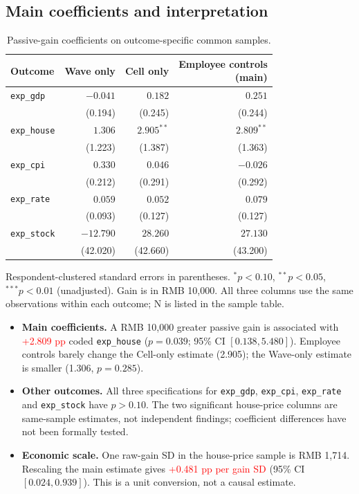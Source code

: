 \documentclass[11pt,letterpaper,english,final]{article}
\begin{document}
\subsection{Main coefficients and interpretation}
\begin{table}[H]
\centering\small
\setlength{\tabcolsep}{5pt}
\caption{Passive-gain coefficients on outcome-specific common samples.}
\begin{tabular}{lrrr}
\toprule
Outcome & Wave only & Cell only & \shortstack{Employee controls\\(main)} \\
\midrule
\texttt{exp\_gdp} & $-0.041$ & $0.182$ & $0.251$ \\
 & (0.194) & (0.245) & (0.244) \\[3pt]
\texttt{exp\_house} & $1.306$ & $\bm{2.905}^{**}$ & $\bm{2.809}^{**}$ \\
 & (1.223) & (1.387) & (1.363) \\[3pt]
\texttt{exp\_cpi} & $0.330$ & $0.046$ & $-0.026$ \\
 & (0.212) & (0.291) & (0.292) \\[3pt]
\texttt{exp\_rate} & $0.059$ & $0.052$ & $0.079$ \\
 & (0.093) & (0.127) & (0.127) \\[3pt]
\texttt{exp\_stock} & $-12.790$ & $28.260$ & $27.130$ \\
 & (42.020) & (42.660) & (43.200) \\[3pt]
\bottomrule
\end{tabular}
\par\vspace{4pt}\begin{minipage}{\linewidth}\footnotesize Respondent-clustered standard errors in parentheses. $^{*}p<0.10$, $^{**}p<0.05$, $^{***}p<0.01$ (unadjusted). Gain is in RMB 10,000. All three columns use the same observations within each outcome; N is listed in the sample table.\end{minipage}
\end{table}

\begin{itemize}
\item \textbf{Main coefficients.} A RMB 10,000 greater passive gain is associated with \textcolor{red}{+2.809 pp} coded \texttt{exp\_house} ($p=0.039$; 95\% CI $[0.138,5.480]$). Employee controls barely change the Cell-only estimate (2.905); the Wave-only estimate is smaller (1.306, $p=0.285$).
\item \textbf{Other outcomes.} All three specifications for \texttt{exp\_gdp}, \texttt{exp\_cpi}, \texttt{exp\_rate} and \texttt{exp\_stock} have $p>0.10$. The two significant house-price columns are same-sample estimates, not independent findings; coefficient differences have not been formally tested.
\item \textbf{Economic scale.} One raw-gain SD in the house-price sample is RMB 1,714. Rescaling the main estimate gives \textcolor{red}{+0.481 pp per gain SD} (95\% CI $[0.024,0.939]$). This is a unit conversion, not a causal estimate.
\end{itemize}
\end{document}
